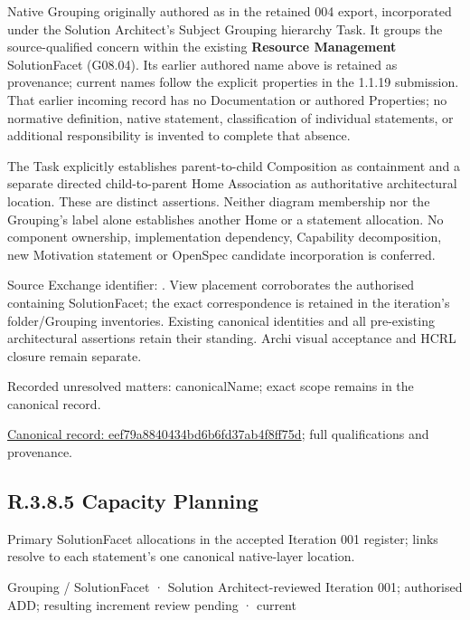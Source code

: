 Native Grouping originally authored as \texttt{} in the retained 004 export,
incorporated under the Solution Architect's Subject Grouping hierarchy Task.
It groups the source-qualified \texttt{} concern within
the existing \textbf{Resource Management} SolutionFacet (G08.04). Its earlier authored name above is retained as provenance; current names
follow the explicit properties in the 1.1.19 submission.
That earlier incoming record has no Documentation or authored Properties; no normative
definition, native statement, classification of individual statements, or
additional responsibility is invented to complete that absence.



The Task explicitly establishes parent-to-child Composition as containment and
a separate directed child-to-parent Home Association as authoritative architectural
location. These are distinct assertions. Neither diagram membership nor the
Grouping's label alone establishes another Home or a statement allocation.
No component ownership, implementation dependency, Capability decomposition,
new Motivation statement or OpenSpec candidate incorporation is conferred.



Source Exchange identifier: \texttt{}. View placement corroborates
the authorised containing SolutionFacet; the exact correspondence is retained in the
iteration's folder/Grouping inventories. Existing canonical identities and all
pre-existing architectural assertions retain their standing. Archi visual
acceptance and HCRL closure remain separate.


{\small Recorded unresolved matters: canonicalName; exact scope remains in the canonical record.}\par
{\footnotesize \href{../../../../../../../continuum/grouping/eef79a8840434bd6b6fd37ab4f8ff75d.md}{Canonical record: eef79a8840434bd6b6fd37ab4f8ff75d}; full qualifications and provenance.}\par
\subsection*{R.3.8.5 Capacity Planning}
\label{navigation:R.3.8.5}

Primary SolutionFacet allocations in the accepted Iteration 001 register; links resolve to each statement’s one canonical native-layer location.\par
\label{element:f5df30b02e8a4d60bf44e8af2da4d5ab}
{\small Grouping / SolutionFacet · Solution Architect-reviewed Iteration 001; authorised ADD; resulting increment review pending · current}\par


